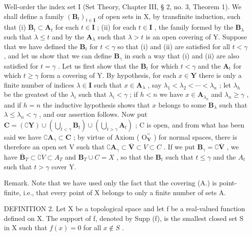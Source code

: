 Well-order the index set I (Set Theory, Chapter III, § 2, no. 3, Theorem 1). We shall define a family \((\mathbf{B}_t)_{t \in \mathbf{I}}\) of open sets in X, by transfinite induction, such that (i) \(\overline{\mathbf{B}}_t \subset \mathbf{A}_t\) for each \(t \in \mathbf{I}\) ; (ii) for each \(t \in \mathbf{I}\) , the family formed by the \(\mathbf{B}_\lambda\) such that \(\lambda \leqslant t\) and by the \(\mathbf{A}_\lambda\) such that \(\lambda > t\) is an open covering of Y. Suppose that we have defined the \(\mathbf{B}_t\) for \(t < \gamma\) so that (i) and (ii) are satisfied for all \(t < \gamma\) , and let us show that we can define \(\mathbf{B}_\gamma\) in such a way that (i) and (ii) are also satisfied for \(t = \gamma\) . Let us first show that the \(\mathbf{B}_t\) for which \(t < \gamma\) and the \(\mathbf{A}_t\) for which \(t \geqslant \gamma\) form a covering of Y. By hypothesis, for each \(x \in \mathbf{Y}\) there is only a finite number of indices \(\lambda \in \mathbf{I}\) such that \(x \in \mathbf{A}_\lambda\) , say \(\lambda_1 < \lambda_2 < \cdots < \lambda_n\) ; let \(\lambda_h\) be the greatest of the \(\lambda_i\) such that \(\lambda_i < \gamma\) ; if \(h < n\) we have \(x \in \mathbf{A}_{\lambda_n}\) and \(\lambda_n \geqslant \gamma\) , and if \(h = n\) the inductive hypothesis shows that \(x\) belongs to some \(\mathbf{B}_\lambda\) such that \(\lambda \leqslant \lambda_n < \gamma\) , and our assertion follows. Now put \(\mathbf{C} = (\complement\mathbf{Y}) \cup (\bigcup_{t < \gamma} \mathbf{B}_t) \cup (\bigcup_{t > \gamma} \mathbf{A}_t)\) ; C is open, and from what has been said we have \(\complement\mathbf{A}_\gamma \subset \mathbf{C}\) ; by virtue of Axiom ( \(\mathrm{O}_{\mathbf{V}}^{\prime\prime}\) ) for normal spaces, there is therefore an open set V such that \(\complement\mathbf{A}_\gamma \subset \overline{\mathbf{V}} \subset V \subset C\) . If we put \(\mathbf{B}_\gamma = \complement\overline{\mathbf{V}}\) , we have \(\overline{\mathbf{B}}_T \subset \complement V \subset A_T\) and \(\mathbf{B}_T \cup C = X\) , so that the \(\mathbf{B}_t\) such that \(t \leqslant \gamma\) and the \(A_t\) such that \(t > \gamma\) cover Y.

Remark. Note that we have used only the fact that the covering (A.) is point-finite, i.e., that every point of X belongs to only a finite number of sets A.

DEFINITION 2. Let X be a topological space and let f be a real-valued function defined on X. The support of f, denoted by Supp (f), is the smallest closed set S in X such that \(f(x) = 0\) for all \(x \notin S\) .

